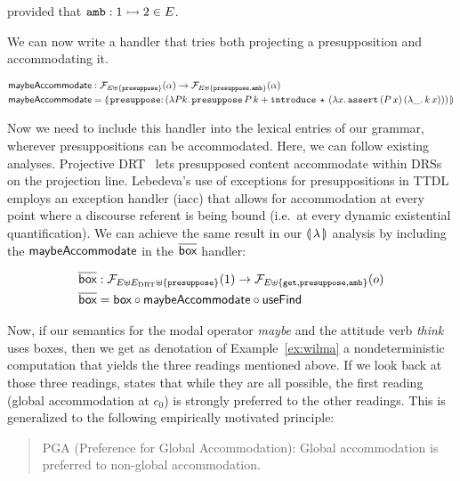 provided that $\mathtt{amb} : 1 \rightarrowtail 2 \in E$.

We can now write a handler that tries both projecting a presupposition and
accommodating it.

\begin{align*}
  \maybeAccommodate &: \FF_{E \uplus \{\op{presuppose}\}}(\alpha) \to
                      \FF_{E \uplus \{\op{presuppose},\op{amb}\}}(\alpha) \\
  \maybeAccommodate &= \banana{\onto{\op{presuppose}}{(\lam{P k}{
    \app{\op{presuppose}}{P}{k} +
    \app{\op{introduce}}{\star}{(\lam{x}{\app{\op{assert}}{(\ap{P}{x})}{(\lam{\_}{\ap{k}{x}})}})}})}}
\end{align*}

Now we need to include this handler into the lexical entries of our
grammar, wherever presuppositions can be accommodated. Here, we can follow
existing analyses. Projective DRT~\cite{venhuizen2013parsimonious} lets
presupposed content accommodate within DRSs on the projection
line. Lebedeva's use of exceptions for presuppositions in
TTDL~\cite{lebedeva2012expression} employs an exception handler
($\mathrm{iacc}$) that allows for accommodation at every point where a
discourse referent is being bound (i.e.\ at every dynamic existential
quantification). We can achieve the same result in our $\llparenthesis \, \lambda \, \rrparenthesis$
analysis by including the $\textsf{maybeAccommodate}$ in the $\overline{\textsf{box}}$ handler:

\begin{align*}
  \overline{\textsf{box}} &: \mathcal{F}_{E \uplus E_{\mathrm{DRT}} \uplus \{\mathtt{presuppose}\}}(1) \to \mathcal{F}_{E \uplus \{\mathtt{get}, \mathtt{presuppose}, \mathtt{amb}\}}(o) \\
  \overline{\textsf{box}} &= \textsf{box} \circ \textsf{maybeAccommodate} \circ \textsf{useFind}
\end{align*}

Now, if our semantics for the modal operator \emph{maybe} and the attitude
verb \emph{think} uses boxes, then we get as denotation of
Example~\ref{ex:wilma} a nondeterministic computation that yields the three
readings mentioned above. If we look back at those three readings,
\cite{sep-presupposition} states that while they are all possible, the
first reading (global accommodation at $c_0$) is strongly preferred to the
other readings. This is generalized to the following empirically motivated
principle:

\begin{quote}
PGA (Preference for Global Accommodation): Global accommodation is
preferred to non-global accommodation.
\end{quote}

